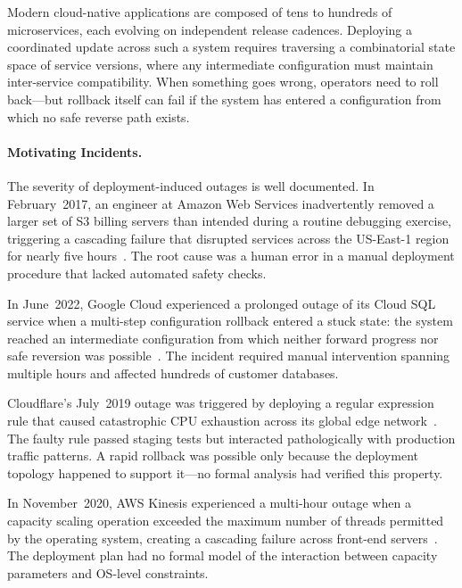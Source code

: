 \documentclass[10pt,twocolumn]{article}
\begin{document}
Modern cloud-native applications are composed of tens to
hundreds of microservices, each evolving on independent release
cadences. Deploying a coordinated update across such a system
requires traversing a combinatorial state space of service
versions, where any intermediate configuration must maintain
inter-service compatibility. When something goes wrong, operators
need to roll back---but rollback itself can fail if the system
has entered a configuration from which no safe reverse path
exists.

\paragraph{Motivating Incidents.}
The severity of deployment-induced outages is well documented.
In February~2017, an engineer at Amazon Web Services
inadvertently removed a larger set of S3 billing servers than
intended during a routine debugging exercise, triggering a
cascading failure that disrupted services across the US-East-1
region for nearly five hours~\cite{aws-s3-2017}. The root cause
was a human error in a manual deployment procedure that lacked
automated safety checks.

In June~2022, Google Cloud experienced a prolonged outage of
its Cloud SQL service when a multi-step configuration rollback
entered a stuck state: the system reached an intermediate
configuration from which neither forward progress nor safe
reversion was possible~\cite{gcloud-sql-2022}. The incident
required manual intervention spanning multiple hours and affected
hundreds of customer databases.

Cloudflare's July~2019 outage was triggered by deploying a
regular expression rule that caused catastrophic CPU exhaustion
across its global edge network~\cite{cloudflare-2019}. The
faulty rule passed staging tests but interacted pathologically
with production traffic patterns. A rapid rollback was possible
only because the deployment topology happened to support it---no
formal analysis had verified this property.

In November~2020, AWS Kinesis experienced a multi-hour outage
when a capacity scaling operation exceeded the maximum number
of threads permitted by the operating system, creating a
cascading failure across front-end servers~\cite{aws-kinesis-2020}.
The deployment plan had no formal model of the interaction
between capacity parameters and OS-level constraints.
\end{document}
